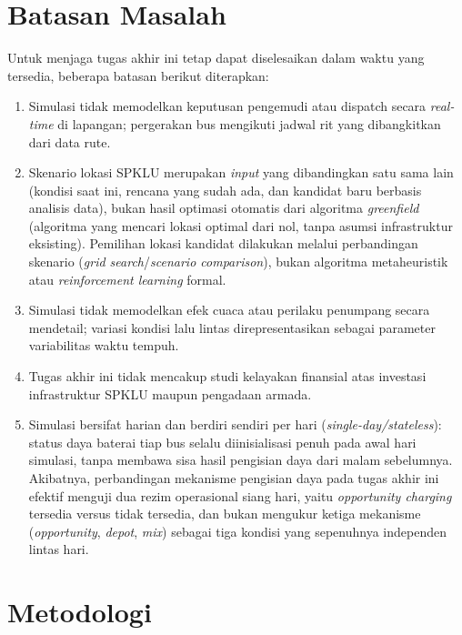 \section{Batasan Masalah}

Untuk menjaga tugas akhir ini tetap dapat diselesaikan dalam waktu yang
tersedia, beberapa batasan berikut diterapkan:
\begin{enumerate}
	\item Simulasi tidak memodelkan keputusan pengemudi atau dispatch secara
	\textit{real-time} di lapangan; pergerakan bus mengikuti jadwal rit yang
	dibangkitkan dari data rute.
	\item Skenario lokasi SPKLU merupakan \textit{input} yang dibandingkan satu
	sama lain (kondisi saat ini, rencana yang sudah ada, dan kandidat baru
	berbasis analisis data), bukan hasil optimasi otomatis dari algoritma
	\textit{greenfield} (algoritma yang mencari lokasi optimal dari nol,
	tanpa asumsi infrastruktur eksisting). Pemilihan lokasi kandidat dilakukan melalui
	perbandingan skenario (\textit{grid search}/\textit{scenario comparison}),
	bukan algoritma metaheuristik atau \textit{reinforcement learning} formal.
	\item Simulasi tidak memodelkan efek cuaca atau perilaku penumpang secara
	mendetail; variasi kondisi lalu lintas direpresentasikan sebagai parameter
	variabilitas waktu tempuh.
	\item Tugas akhir ini tidak mencakup studi kelayakan finansial atas investasi
	infrastruktur SPKLU maupun pengadaan armada.
	\item Simulasi bersifat harian dan berdiri sendiri per hari (\textit{single-day/stateless}):
	status daya baterai tiap bus selalu diinisialisasi penuh pada awal hari
	simulasi, tanpa membawa sisa hasil pengisian daya dari malam sebelumnya.
	Akibatnya, perbandingan mekanisme pengisian daya pada tugas akhir ini
	efektif menguji dua rezim operasional siang hari, yaitu \textit{opportunity
		charging} tersedia versus tidak tersedia, dan bukan mengukur ketiga
	mekanisme (\textit{opportunity}, \textit{depot}, \textit{mix}) sebagai tiga
	kondisi yang sepenuhnya independen lintas hari.
\end{enumerate}

\section{Metodologi}

